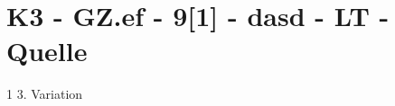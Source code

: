 \section{K3 - GZ.ef - 9[1] - dasd - LT - Quelle}

\begin{langesbeispiel}\item[1] %
3. Variation

\end{langesbeispiel}